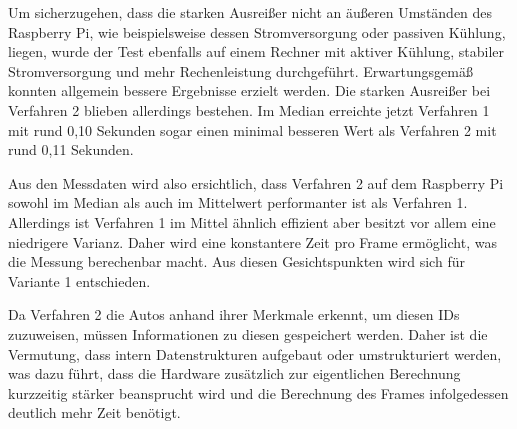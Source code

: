 Um sicherzugehen, dass die starken Ausreißer nicht an äußeren Umständen des Raspberry Pi, wie beispielsweise dessen Stromversorgung oder passiven Kühlung, liegen, wurde der Test ebenfalls auf einem Rechner mit aktiver Kühlung, stabiler Stromversorgung und mehr Rechenleistung durchgeführt.
Erwartungsgemäß konnten allgemein bessere Ergebnisse erzielt werden.
Die starken Ausreißer bei Verfahren 2 blieben allerdings bestehen.
Im Median erreichte jetzt Verfahren 1 mit rund 0,10 Sekunden sogar einen minimal besseren Wert als Verfahren 2 mit rund 0,11 Sekunden.

Aus den Messdaten wird also ersichtlich, dass Verfahren 2 auf dem Raspberry Pi sowohl im Median als auch im Mittelwert performanter ist als Verfahren 1.
Allerdings ist Verfahren 1 im Mittel ähnlich effizient aber besitzt vor allem eine niedrigere Varianz.
Daher wird eine konstantere Zeit pro Frame ermöglicht, was die Messung berechenbar macht.
Aus diesen Gesichtspunkten wird sich für Variante 1 entschieden.

Da Verfahren 2 die Autos anhand ihrer Merkmale erkennt, um diesen IDs zuzuweisen, müssen Informationen zu diesen gespeichert werden.
Daher ist die Vermutung, dass intern Datenstrukturen aufgebaut oder umstrukturiert werden, was dazu führt, dass die Hardware zusätzlich zur eigentlichen Berechnung kurzzeitig stärker beansprucht wird und die Berechnung des Frames infolgedessen deutlich mehr Zeit benötigt.

